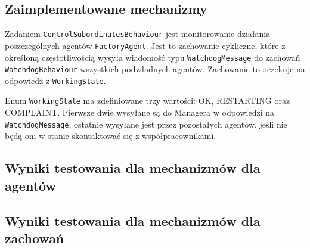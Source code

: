 \subsection{Zaimplementowane mechanizmy}
Zadaniem \texttt{ControlSubordinatesBehaviour} jest monitorowanie działania poszczególnych agentów \texttt{FactoryAgent}. Jest to zachowanie cykliczne, które z określoną częstotliwością wysyła wiadomość typu \texttt{WatchdogMessage} do zachowań \texttt{WatchdogBehaviour} wszystkich podwładnych agentów. Zachowanie to oczekuje na odpowiedź z \texttt{WorkingState}. 

Enum \texttt{WorkingState} ma zdefiniowane trzy wartości: OK, RESTARTING oraz COMPLAINT. Pierwsze dwie wysyłane są do Managera w odpowiedzi na \texttt{WatchdogMessage}, ostatnie wysyłane jest przez pozostałych agentów, jeśli nie będą oni w stanie skontaktować się z współpracownikami.

\subsection{Wyniki testowania dla mechanizmów dla agentów}

\subsection{Wyniki testowania dla mechanizmów dla zachowań}



